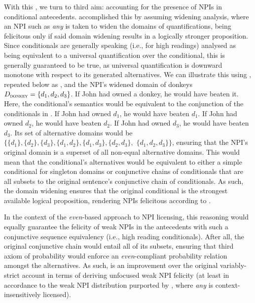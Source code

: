 With this , we turn to  third aim: accounting for the presence of NPIs in conditional antecedents. \textcite{vanRooij2006} accomplished this by assuming  widening analysis, where an NPI such as \textit{any} is taken to widen the domains of quantifications, being felicitous only if said domain widening results in a logically stronger proposition. Since  conditionals are generally speaking (i.e., for high readings) analysed as being equivalent to a universal quantification over the conditional, this is generally guaranteed to be true, as universal quantification is downward monotone with respect to its generated alternatives. We can illustrate this using , repeated below as , and the NPI's widened domain of donkeys $D_\text{\scshape donkey}=\{d_1,d_2,d_3\}$.
\ex{}
If John had owned a donkey, he would have beaten it.
\xe
Here, the conditional's semantics would be equivalent to the conjunction of the conditionals in .
\pex[nopreamble=true]\label{ex:donkey-conjunction2}%
\a{} If John had owned $d_1$, he would have beaten $d_1$.
\a{} If John had owned $d_2$, he would have beaten $d_2$.
\a{} If John had owned $d_3$, he would have beaten $d_3$.
\xe
Its set of alternative domains would be $\{\{d_1\},\{d_2\},\{d_3\},\{d_1,d_2\},\{d_1,d_3\},\{d_2,d_3\},$ $\{d_1,d_2,d_3\}\}$, ensuring that the NPI's original domain is a superset of all non-equal alternative domains. This would mean that the conditional's alternatives would be equivalent to either a simple conditional for singleton domains or conjunctive chains of conditionals that are all subsets to the original sentence's conjunctive chain of conditionals. As such, the domain widening ensures that the original conditional is the strongest available logical proposition, rendering NPIs felicitous according to \textcite{Kadmon1993}.

In the context of the \textit{even}-based approach to NPI licensing, this reasoning would equally guarantee the felicity of weak NPIs in the antecedents with such a conjunctive sequence equivalency (i.e., high reading conditionals). After all, the original conjunctive chain would entail all of its subsets, ensuring that  third axiom of probability would enforce an \textit{even}-compliant probability relation amongst the alternatives. As such, \textcite{vanRooij2006} is an improvement over the original variably-strict account in terms of deriving unfocused weak NPI felicity (at least in accordance to the weak NPI distribution purported by \textcite{Crnic2014-dogma}, where \textit{any} is context-insensitively licensed). 

